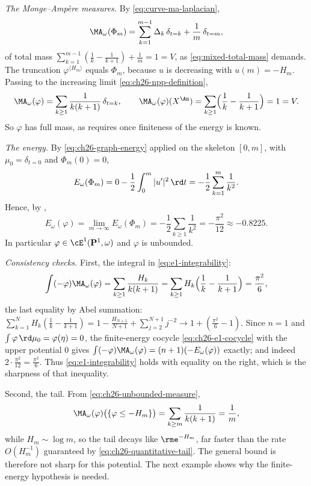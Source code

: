 \begin{example}
\emph{The Monge--Amp\`ere measures.}  By
\eqref{eq:curve-ma-laplacian},
\[
 \MA_\omega(\Phi_m)
 =\sum_{k=1}^{m-1}\Delta_k\,\delta_{t=k}+\frac1m\,\delta_{t=m},
\]
of total mass $\sum_{k=1}^{m-1}(\tfrac1k-\tfrac1{k+1})+\tfrac1m=1=V$, as
\eqref{eq:mixed-total-mass} demands.  The truncation
$\varphi^{\langle H_m\rangle}$ equals $\Phi_m$, because $u$ is
decreasing with $u(m)=-H_m$.  Passing to the increasing limit
\eqref{eq:ch26-npp-definition},
\begin{equation}
\label{eq:ch26-unbounded-measure}
 \MA_\omega(\varphi)=\sum_{k\geq1}\frac{1}{k(k+1)}\,\delta_{t=k},
 \qquad
 \MA_\omega(\varphi)(X^{\An})=\sum_{k\geq1}
   \Bigl(\frac1k-\frac1{k+1}\Bigr)=1=V .
\end{equation}
So $\varphi$ has full mass, as  requires
once finiteness of the energy is known.

\emph{The energy.}  By \eqref{eq:ch26-graph-energy} applied on the skeleton
$[0,m]$, with $\mu_0=\delta_{t=0}$ and $\Phi_m(0)=0$,
\[
 E_\omega(\Phi_m)
 =0-\frac12\int_0^m|u'|^2\,\rd t
 =-\frac12\sum_{k=1}^m\frac1{k^2}.
\]
Hence, by ,
\begin{equation}
\label{eq:ch26-unbounded-energy}
 E_\omega(\varphi)=\lim_{m\to\infty}E_\omega(\Phi_m)
 =-\frac12\sum_{k\geq1}\frac1{k^2}
 =-\frac{\pi^2}{12}\approx-0.8225 .
\end{equation}
In particular $\varphi\in\cE^1(\mathbf P^1,\omega)$ and $\varphi$ is
unbounded.

\emph{Consistency checks.}  First, the integral in
\eqref{eq:e1-integrability}:
\[
 \int(-\varphi)\MA_\omega(\varphi)
 =\sum_{k\geq1}\frac{H_k}{k(k+1)}
 =\sum_{k\geq1}H_k\Bigl(\frac1k-\frac1{k+1}\Bigr)
 =\frac{\pi^2}{6},
\]
the last equality by Abel summation:
$\sum_{k=1}^NH_k(\tfrac1k-\tfrac1{k+1})
=1-\tfrac{H_{N+1}}{N+1}+\sum_{j=2}^{N+1}j^{-2}\to1+(\tfrac{\pi^2}{6}-1)$.
Since $n=1$ and $\int\varphi\,\rd\mu_0=\varphi(\eta)=0$, the finite-energy
cocycle \eqref{eq:ch26-e1-cocycle} with the upper potential $0$ gives
$\int(-\varphi)\MA_\omega(\varphi)=(n+1)(-E_\omega(\varphi))$ exactly; and
indeed $2\cdot\tfrac{\pi^2}{12}=\tfrac{\pi^2}{6}$.  Thus
\eqref{eq:e1-integrability} holds with equality on the right, which is the
sharpness of that inequality.

Second, the tail.  From \eqref{eq:ch26-unbounded-measure},
\[
 \MA_\omega(\varphi)\bigl(\{\varphi\leq-H_m\}\bigr)
 =\sum_{k\geq m}\frac1{k(k+1)}=\frac1m,
\]
while $H_m\sim\log m$, so the tail decays like $\rme^{-H_m}$, far faster
than the rate $O(H_m^{-1})$ guaranteed by
\eqref{eq:ch26-quantitative-tail}.  The general bound is therefore not sharp for this potential. The next example shows why the finite-energy hypothesis is needed.
\end{example}

